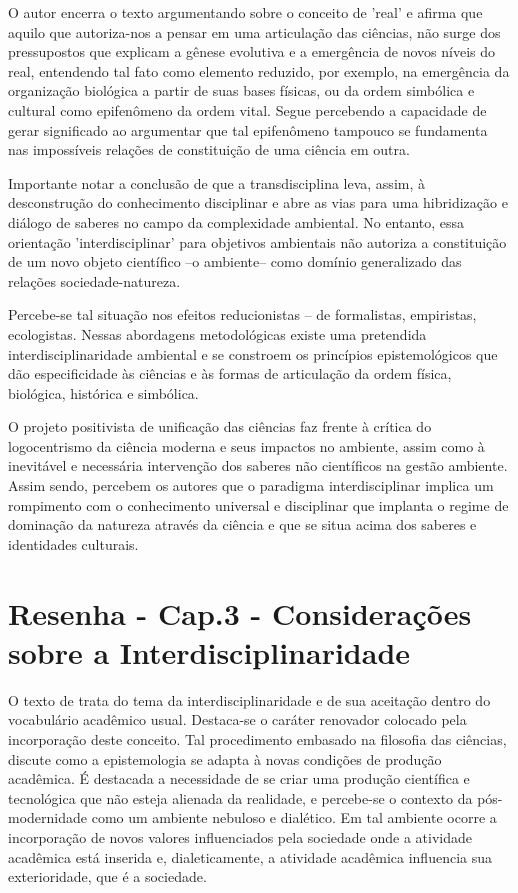 \documentclass[
   article,       %
   12pt,          %
   oneside,       %
   a4paper,       %
   english,       %
   brazil,           %
   sumario=tradicional
   ]{abntex2}
\begin{document}
O autor encerra o texto argumentando sobre o conceito de 'real' e afirma que aquilo que autoriza-nos a pensar em uma articulação das ciências, não surge dos pressupostos que explicam a gênese evolutiva e a emergência de novos níveis do real, entendendo tal fato como elemento reduzido, por exemplo, na emergência da organização biológica a partir de suas bases físicas, ou da ordem simbólica e cultural como epifenômeno da ordem vital. Segue percebendo a capacidade de gerar significado ao argumentar que tal epifenômeno tampouco se fundamenta nas impossíveis relações de constituição de uma ciência em outra. 


Importante notar a conclusão de que a transdisciplina leva, assim, à desconstrução do conhecimento disciplinar e abre as vias para uma hibridização e diálogo de saberes no campo da complexidade ambiental. No entanto, essa orientação 'interdisciplinar' para objetivos ambientais não autoriza a constituição de um novo objeto científico –o ambiente– como domínio generalizado das relações sociedade-natureza.

Percebe-se tal situação nos efeitos reducionistas – de formalistas, empiristas, ecologistas. Nessas abordagens metodológicas existe uma pretendida interdisciplinaridade ambiental e se constroem os princípios epistemológicos que dão especificidade às ciências e às formas de articulação da ordem  física, biológica, histórica e simbólica. 

O projeto positivista de unificação das ciências faz frente à crítica do logocentrismo da ciência moderna e seus impactos no ambiente, assim como à inevitável e necessária intervenção dos saberes não científicos na gestão ambiente. Assim sendo, percebem os autores que o paradigma interdisciplinar implica um rompimento com o conhecimento universal e disciplinar que implanta o regime de dominação da natureza através da ciência e que se situa acima dos saberes e identidades culturais.




\newpage

\section{Resenha - Cap.3 - Considerações sobre a Interdisciplinaridade}


O texto de \cite{consideracoes_Interdisciplinaridade} trata do tema da interdisciplinaridade e de sua aceitação dentro do vocabulário acadêmico usual. Destaca-se o caráter renovador colocado pela incorporação deste conceito. Tal procedimento embasado na filosofia das ciências, discute como a epistemologia se adapta à novas condições de produção acadêmica. É destacada a necessidade de se criar uma produção científica e tecnológica que não esteja alienada da realidade, e percebe-se o contexto da pós-modernidade como um ambiente nebuloso e dialético. Em tal ambiente ocorre a incorporação de novos valores influenciados pela sociedade onde a atividade acadêmica está inserida e, dialeticamente, a atividade acadêmica influencia sua exterioridade, que é a sociedade.
\end{document}
